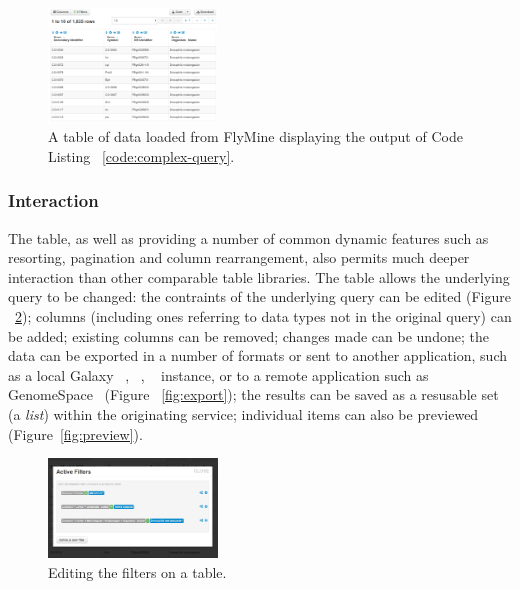 \documentclass[10pt,a4paper,twocolumn]{article}
\begin{document}
\begin{figure}
\centering
\includegraphics[width=0.4\textwidth]{imtable-complex.png}
\caption{
    \label{fig:complex}
    A table of data loaded from FlyMine displaying the output of Code Listing
    ~\ref{code:complex-query}.
}
\end{figure}

\subsubsection*{Interaction}

The table, as well as providing a number of common dynamic features such as
resorting, pagination and column rearrangement, also permits much deeper
interaction than other comparable table libraries. The table allows the
underlying query to be changed: the contraints of the underlying query can be
edited (Figure ~\ref{fig:edit-filters}); columns (including ones referring to
data types not in the original query) can be added; existing columns can be
removed; changes made can be undone; the data can be exported in a number of
formats or sent to another application, such as a local Galaxy
~\cite{goecks2010galaxy}, ~\cite{blankenberg2010galaxy},
~\cite{giardine2005galaxy} instance, or to a remote application such as
GenomeSpace~\cite{genomespace} (Figure ~\ref{fig:export}); the results can be
saved as a resusable set (a \emph{list}) within the originating service;
individual items can also be previewed (Figure~\ref{fig:preview}).

\begin{figure}[htb]
\centering
\includegraphics[width=0.4\textwidth]{table-edit-filters.png}
\caption{\label{fig:edit-filters} Editing the filters on a table.}
\end{figure}
\end{document}
